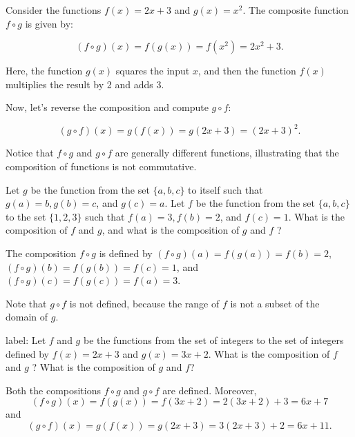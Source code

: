 \begin{example}
    

Consider the functions \( f(x) = 2x + 3 \) and \( g(x) = x^2 \). The composite function \( f \circ g \) is given by:

\[
(f \circ g)(x) = f(g(x)) = f(x^2) = 2x^2 + 3.
\]

Here, the function \( g(x) \) squares the input \( x \), and then the function \( f(x) \) multiplies the result by 2 and adds 3.
\end{example}

Now, let's reverse the composition and compute \( g \circ f \):

\[
(g \circ f)(x) = g(f(x)) = g(2x + 3) = (2x + 3)^2.
\]

Notice that \( f \circ g \) and \( g \circ f \) are generally different functions, illustrating that the composition of functions is not commutative.

\begin{example}
    Let $g$ be the function from the set $\{a, b, c\}$ to itself such that $g(a)=b, g(b)=c$, and $g(c)=a$. Let $f$ be the function from the set $\{a, b, c\}$ to the set $\{1,2,3\}$ such that $f(a)=3, f(b)=2$, and $f(c)=1$. What is the composition of $f$ and $g$, and what is the composition of $g$ and $f$ ?

    \begin{solution}
        The composition $f \circ g$ is defined by $(f \circ g)(a)=f(g(a))=f(b)=2$, $(f \circ g)(b)=f(g(b))=f(c)=1$, and $(f \circ g)(c)=f(g(c))=f(a)=3$.
        
        Note that $g \circ f$ is not defined, because the range of $f$ is not a subset of the domain of $g$.
    \end{solution}
\end{example}


\begin{example}{label:}
Let $f$ and $g$ be the functions from the set of integers to the set of integers defined by $f(x)=2 x+3$ and $g(x)=3 x+2$. What is the composition of $f$ and $g$ ? What is the composition of $g$ and $f$?

\begin{solution}
Both the compositions $f \circ g$ and $g \circ f$ are defined. Moreover,
\[
(f \circ g)(x)=f(g(x))=f(3 x+2)=2(3 x+2)+3=6 x+7
\]
and
\[
(g \circ f)(x)=g(f(x))=g(2 x+3)=3(2 x+3)+2=6 x+11 .
\]
\end{solution}
\end{example}

